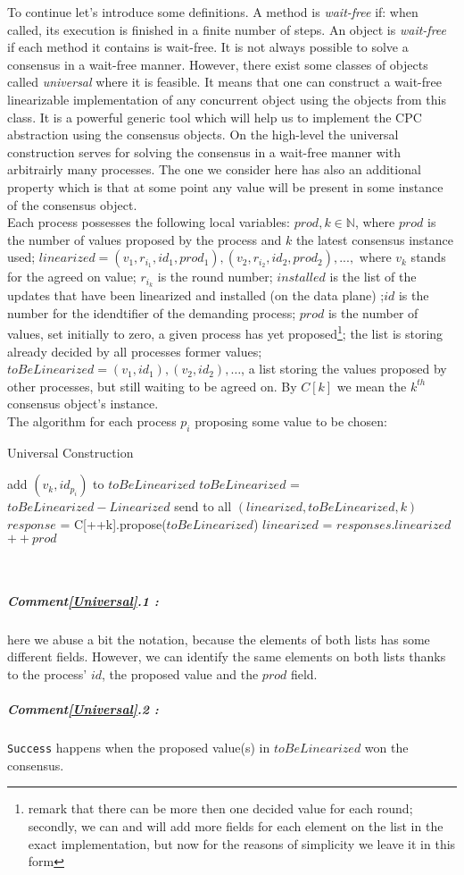 \documentclass{article}
\theoremstyle{remark}
\begin{document}
To continue let's introduce some definitions. A method is \emph{wait-free} if: when called, its execution is finished in a finite number of steps. An object is \emph{wait-free} if each method it contains is wait-free. 
It is not always possible to solve a consensus in a wait-free manner. However, there exist some classes of objects called \emph{universal} where it is feasible. It means that one can construct a wait-free linearizable implementation of any concurrent object using the objects from this class. It is a powerful generic tool which will help us to implement the CPC abstraction using the consensus objects.  
On the high-level the universal construction serves for solving the consensus in a wait-free manner with arbitrairly many processes. The one we consider here has also an additional property which is that at some point any value will be present in some instance of the consensus object.\\
Each process possesses the following local variables: $prod,k\in\mathbb{N}$, where $prod$ is the number of values proposed by the process and $k$ the latest consensus instance used; $linearized=(v_1,r_{i_1},id_1,prod_1),(v_2,r_{i_2},id_2,prod_2),...,$ where $v_k$ stands for the agreed on value; $r_{i_k}$ is the round number; $installed$ is the list of the updates that have been linearized and installed (on the data plane) ;$id$ is the number for the idendtifier of the demanding process; $prod$ is the number of values, set initially to zero, a given process has yet proposed\footnote{remark that there can be more then one decided value for each round; secondly, we can and will add more fields for each element on the list in the exact implementation, but now for the reasons of simplicity we leave it in this form}; the list is storing already decided by all processes former values; $toBeLinearized = (v_1,id_1),(v_2,id_2),\ldots$, a list storing the values proposed by other processes, but still waiting to be agreed on. By $C[k]$ we mean the $k^{th}$ consensus object's instance. \\
The algorithm for each process $p_i$ proposing some value to be chosen:
\begin{algorithm}
  \caption{Universal Construction}\label{Universal}
  \begin{algorithmic}[1]
   \State add $(v_k,id_{p_i})$ to $toBeLinearized$
   \State $toBeLinearized$ = $toBeLinearized - Linearized$
   \State send to all $(linearized, toBeLinearized,k)$
   	\Repeat
   		\State $response$ = C[++k].propose($toBeLinearized$)
   		\State $linearized$ = $responses.linearized$
   	\State $++prod$
  \end{algorithmic}
\end{algorithm}
\\
\subparagraph{Comment\ref{Universal}.1 :} here we abuse a bit the notation, because the elements of both lists has some different fields. However, we can identify the same elements on both lists thanks to the process' $id$, the proposed value and the $prod$ field.
\subparagraph{Comment\ref{Universal}.2 :} \texttt{Success} happens when the proposed value(s) in $toBeLinearized$ won the consensus.
\end{document}
